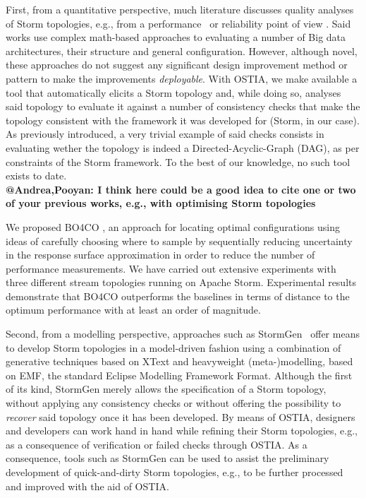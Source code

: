 First, from a quantitative perspective, much literature discusses quality analyses of Storm topologies, e.g., from a performance~\cite{perfbd} or reliability point of view \cite{bigdatareliab}. Said works use complex math-based approaches to evaluating a number of Big data architectures, their structure and general configuration. However, although novel, these approaches do not suggest any significant design improvement method or pattern to make the improvements \emph{deployable}. With OSTIA, we make available a tool that automatically elicits a Storm topology and, while doing so, analyses said topology to evaluate it against a number of consistency checks that make the topology consistent with the framework it was developed for (Storm, in our case). As previously introduced, a very trivial example of said checks consists in evaluating wether the topology is indeed a Directed-Acyclic-Graph (DAG), as per constraints of the Storm framework.  To the best of our knowledge, no such tool exists to date. \\
\textbf{@Andrea,Pooyan: I think here could be a good idea to cite one or two of your previous works, e.g., with optimising Storm topologies}


We proposed {\small \sf BO4CO} \cite{jamshidi-vldb}, an approach for locating optimal configurations using ideas of carefully choosing where to sample by sequentially reducing uncertainty in the response surface approximation in order to reduce the number of performance measurements. We have carried out extensive experiments with three different stream topologies running on Apache Storm. Experimental results demonstrate that {\small \sf BO4CO} outperforms the baselines in terms of distance to the optimum performance with at least an order of magnitude. 

Second, from a modelling perspective, approaches such as StormGen~\cite{stormgen} offer means to develop Storm topologies in a model-driven fashion using a combination of generative techniques based on XText and heavyweight (meta-)modelling, based on EMF, the standard Eclipse Modelling Framework Format. Although the first of its kind, StormGen merely allows the specification of a Storm topology, without applying any consistency checks or without offering the possibility to \emph{recover} said topology once it has been developed. By means of OSTIA, designers and developers can work hand in hand while refining their Storm topologies, e.g., as a consequence of verification or failed checks through OSTIA. As a consequence, tools such as StormGen can be used to assist the preliminary development of quick-and-dirty Storm topologies, e.g., to be further processed and improved with the aid of OSTIA.

